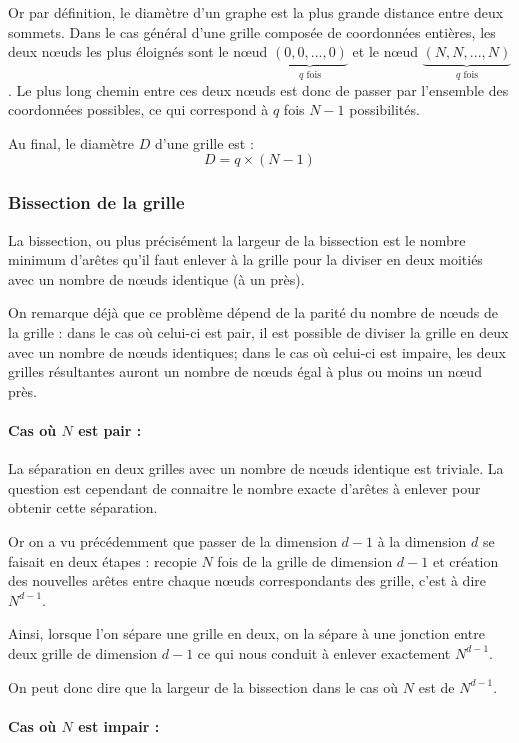 Or par définition, le diamètre d'un graphe est la plus grande distance entre deux sommets. Dans le cas général d'une grille composée de coordonnées entières, les deux nœuds les plus éloignés sont le nœud $\underbrace{(0,0,...,0)}_{q \text{ fois}}$ et le nœud $\underbrace{(N,N,...,N)}_{q \text{ fois}}$. Le plus long chemin entre ces deux nœuds est donc de passer par l'ensemble des coordonnées possibles, ce qui correspond à $q$ fois $N-1$ possibilités.

Au final, le diamètre $D$ d'une grille est : $$D = q\times(N-1)$$

\subsubsection{Bissection de la grille}
La bissection, ou plus précisément la largeur de la bissection est le nombre minimum d'arêtes qu'il faut enlever à la grille pour la diviser en deux moitiés avec un nombre de nœuds identique (à un près).

On remarque déjà que ce problème dépend de la parité du nombre de nœuds de la grille : dans le cas où celui-ci est pair, il est possible de diviser la grille en deux avec un nombre de nœuds identiques; dans le cas où celui-ci est impaire, les deux grilles résultantes auront un nombre de nœuds égal à plus ou moins un nœud près.

\paragraph{Cas où $N$ est pair :}

La séparation en deux grilles avec un nombre de nœuds identique est triviale. La question est cependant de connaitre le nombre exacte d'arêtes à enlever pour obtenir cette séparation.

Or on a vu précédemment que passer de la dimension $d-1$ à la dimension $d$ se faisait en deux étapes : recopie $N$ fois de la grille de dimension $d-1$ et création des nouvelles arêtes entre chaque nœuds correspondants des grille, c'est à dire $N^{d-1}$.

Ainsi, lorsque l'on sépare une grille en deux, on la sépare à une jonction entre deux grille de dimension $d-1$ ce qui nous conduit à enlever exactement $N^{d-1}$.

On peut donc dire que la largeur de la bissection dans le cas où $N$ est de $N^{d-1}$.

\paragraph{Cas où $N$ est impair :}

